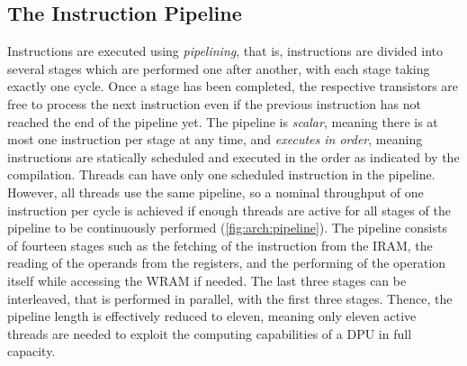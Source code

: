 \subsection{The Instruction Pipeline}
\label{sec:prereq:arch:pipeline}

Instructions are executed using \emph{pipelining}, that is, instructions are divided into several stages which are performed one after another, with each stage taking exactly one cycle.
Once a stage has been completed, the respective transistors are free to process the next instruction even if the previous instruction has not reached the end of the pipeline yet.
The pipeline is \emph{scalar}, meaning there is at most one instruction per stage at any time, and \emph{executes in order}, meaning instructions are statically scheduled and executed in the order as indicated by the compilation.
Threads can have only one scheduled instruction in the pipeline.
However, all threads use the same pipeline, so a nominal throughput of one instruction per cycle is achieved if enough threads are active for all stages of the pipeline to be continuously performed (\cref{fig:arch:pipeline}).
The pipeline consists of fourteen stages such as the fetching of the instruction from the \ac{IRAM}, the reading of the operands from the registers, and the performing of the operation itself while accessing the \ac{WRAM} if needed.
The last three stages can be interleaved, that is performed in parallel, with the first three stages.
Thence, the pipeline length is effectively reduced to eleven, meaning only eleven active threads are needed to exploit the computing capabilities of a \ac{DPU} in full capacity.

